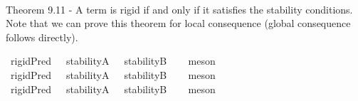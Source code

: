 \begin{isabellebody}
\ %
%
\isamarkupfalse%
\ %
%
%
%
%
\begin{isamarkuptext}%
Theorem 9.11 - A term is rigid if and only if it satisfies the stability conditions. Note that
 we can prove this theorem for local consequence (global consequence follows directly).%
\end{isamarkuptext}\isamarkuptrue%
\isamarkupfalse%
\ {\isachardoublequoteopen}{\isasymlfloor}rigidPred\ {\isacharparenleft}{\isasymtau}{\isacharcolon}{\isacharcolon}{\isasymup}{\isasymlangle}{\isasymzero}{\isasymrangle}{\isacharparenright}\ \isactrlbold {\isasymleftrightarrow}\ {\isacharparenleft}stabilityA\ {\isasymtau}\ \isactrlbold {\isasymand}\ stabilityB\ {\isasymtau}{\isacharparenright}{\isasymrfloor}{\isachardoublequoteclose}%
\ %
%
\isamarkupfalse%
\ meson%
%
%
\ \ \ \isanewline
{}\isamarkupfalse%
\ {\isachardoublequoteopen}{\isasymlfloor}rigidPred\ {\isacharparenleft}{\isasymtau}{\isacharcolon}{\isacharcolon}{\isasymup}{\isasymlangle}{\isasymup}{\isasymzero}{\isasymrangle}{\isacharparenright}\ \isactrlbold {\isasymleftrightarrow}\ {\isacharparenleft}stabilityA\ {\isasymtau}\ \isactrlbold {\isasymand}\ stabilityB\ {\isasymtau}{\isacharparenright}{\isasymrfloor}{\isachardoublequoteclose}%
\ %
%
\isamarkupfalse%
\ meson%
%
%
\ \ \ \isanewline
{}\isamarkupfalse%
\ {\isachardoublequoteopen}{\isasymlfloor}rigidPred\ {\isacharparenleft}{\isasymtau}{\isacharcolon}{\isacharcolon}{\isasymup}{\isasymlangle}{\isasymup}{\isasymlangle}{\isasymzero}{\isasymrangle}{\isasymrangle}{\isacharparenright}\ \isactrlbold {\isasymleftrightarrow}\ {\isacharparenleft}stabilityA\ {\isasymtau}\ \isactrlbold {\isasymand}\ stabilityB\ {\isasymtau}{\isacharparenright}{\isasymrfloor}{\isachardoublequoteclose}%
\ %
%
\isamarkupfalse%
\ meson%
%
%
%
%
%
%
%
%
%
\end{isabellebody}%
